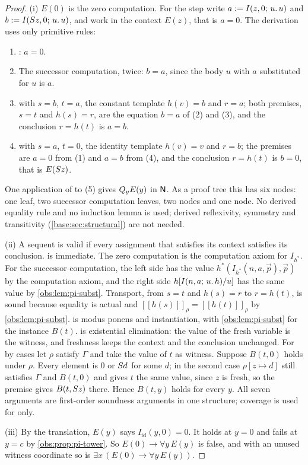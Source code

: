 \begin{proof}
(i) $E(0)$ is the zero computation. For the step write
$a\mathrel{:=}I(z,0;\,u.\,u)$ and $b\mathrel{:=}I(S z,0;\,u.\,u)$, and work in the
context $E(z)$, that is $a=0$. The derivation uses only primitive rules:
\begin{enumerate}[label=(\arabic*)]
\item {}: $a=0$.
\item[(2), (3)] The successor computation, twice: $b=a$, since the body $u$
with $a$ substituted for $u$ is $a$.
\setcounter{enumi}{3}
\item {} with $s=b$, $t=a$, the constant template $h(v)=b$ and
$r=a$; both premises, $s=t$ and $h(s)=r$, are the equation $b=a$ of (2) and
(3), and the conclusion $r=h(t)$ is $a=b$.
\item {} with $s=a$, $t=0$, the identity template $h(v)=v$ and
$r=b$; the premises are $a=0$ from (1) and $a=b$ from (4), and the conclusion
$r=h(t)$ is $b=0$, that is $E(S z)$.
\end{enumerate}
One application of  to (5) gives $Q_{y}E(y)$ in $\mathsf{N}$. As a
proof tree this has six nodes: one  leaf, two successor
computation leaves, two  nodes and one  node. No
derived equality rule and no induction lemma is used; derived reflexivity,
symmetry and transitivity (\cref{base:sec:structural}) are not needed.

(ii) A sequent is valid if every assignment that satisfies its context
satisfies its conclusion.  is immediate. The zero computation is
the computation axiom for $I_{h^{*}}$. For the successor computation, the left
side has the value $h^{*}(I_{h^{*}}(n,a,\vec p),\vec p)$ by the computation
axiom, and the right side $h[I(n,a;\,u.\,h)/u]$ has the same value by
\cref{obs:lem:pi-subst}. Transport, from $s=t$ and $h(s)=r$ to $r=h(t)$, is
sound because equality is actual and
$[\![h(s)]\!]_\rho=[\![h(t)]\!]_\rho$ by \cref{obs:lem:pi-subst}.
 is modus ponens and instantiation, with
\cref{obs:lem:pi-subst} for the instance $B(t)$.  is existential
elimination: the value of the fresh variable is the witness, and freshness
keeps the context and the conclusion unchanged. For  by cases let
$\rho$ satisfy $\Gamma$ and take the value of $t$ as witness. Suppose $B(t,0)$
holds under $\rho$. Every element is $0$ or $S d$ for some $d$; in the
second case $\rho[z\mapsto d]$ still satisfies $\Gamma$ and $B(t,0)$ and gives
$t$ the same value, since $z$ is fresh, so the premise gives $B(t,S z)$
there. Hence $B(t,y)$ holds for every $y$. All seven arguments are first-order
soundness arguments in one structure; coverage is used for  only.

(iii) By the translation, $E(y)$ says $I_{\mathrm{id}}(y,0)=0$. It holds at
$y=0$ and fails at $y=c$ by \cref{obs:prop:pi-tower}. So
$E(0)\to\forall y\,E(y)$ is false, and with an unused witness coordinate so is
$\exists x\,(E(0)\to\forall y\,E(y))$.
\end{proof}

